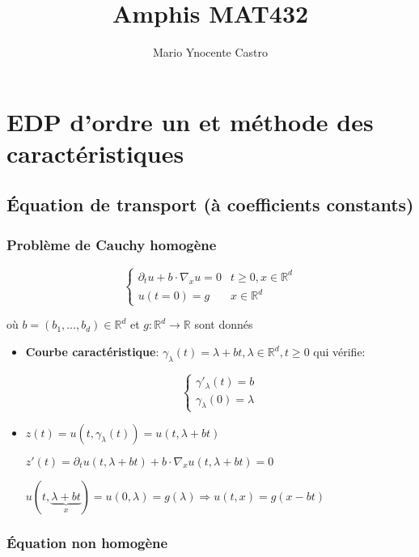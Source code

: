\documentclass[10pt,a4paper,oneside]{article}
\begin{document}
\title{Amphis MAT432}
\author{Mario Ynocente Castro}

\maketitle

\section{EDP d'ordre un et méthode des caractéristiques}

\subsection{Équation de transport (à coefficients constants)}

\subsubsection{Problème de Cauchy homogène}

\[ \begin{cases}
\partial_t u + b \cdot \nabla_x u = 0 & t \geq 0, x \in \mathbb{R}^d \\
u(t = 0) = g & x \in \mathbb{R}^d
\end{cases} \]

où $b = (b_1, \ldots, b_d) \in \mathbb{R}^d$ et $g: \mathbb{R}^d \to \mathbb{R}$ sont donnés

\begin{itemize}
\item
\textbf{Courbe caractéristique}: $\gamma_{\lambda}(t) = \lambda + bt, \lambda \in \mathbb{R}^d, t \geq 0$ qui vérifie:

\[ \begin{cases}
\gamma'_{\lambda}(t) = b \\
\gamma_{\lambda}(0) = \lambda
\end{cases} \]

\item
$z(t) = u(t,\gamma_{\lambda}(t)) = u(t,\lambda + bt)$

$z'(t) = \partial_t u(t,\lambda + bt) + b \cdot \nabla_x u(t,\lambda + bt) = 0$

$u(t,\underbrace{\lambda + bt}_{x}) = u(0,\lambda) = g(\lambda) \Rightarrow \boxed{u(t,x) = g(x - bt)}$

\end{itemize}

\subsubsection{Équation non homogène}
\end{document}
